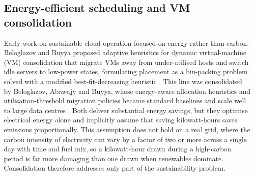 \documentclass[12pt,a4paper]{article}
\begin{document}
\subsection{Energy-efficient scheduling and VM consolidation}
Early work on sustainable cloud operation focused on energy rather than carbon. Beloglazov and Buyya proposed
adaptive heuristics for dynamic virtual-machine (VM) consolidation that migrate VMs away from under-utilised
hosts and switch idle servers to low-power states, formulating placement as a bin-packing problem solved with
a modified best-fit-decreasing heuristic \cite{beloglazov2012optimal}. This line was consolidated by
Beloglazov, Abawajy and Buyya, whose energy-aware allocation heuristics and utilisation-threshold migration
policies became standard baselines and scale well to large data centres \cite{beloglazov2012energy}. Both
deliver substantial energy savings, but they optimise electrical energy alone and implicitly assume that
saving kilowatt-hours saves emissions proportionally. This assumption does not hold on a real grid, where the
carbon intensity of electricity can vary by a factor of two or more across a single day with time and fuel
mix, so a kilowatt-hour drawn during a high-carbon period is far more damaging than one drawn when renewables
dominate. Consolidation therefore addresses only part of the sustainability problem.
\end{document}
